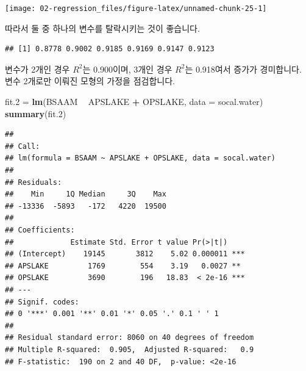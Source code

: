 \documentclass[12pt,]{book}
\newenvironment{Shaded}{\begin{snugshade}}{\end{snugshade}}
\newcommand{\DataTypeTok}[1]{\textcolor[rgb]{0.13,0.29,0.53}{#1}}
\newcommand{\FloatTok}[1]{\textcolor[rgb]{0.00,0.00,0.81}{#1}}
\newcommand{\KeywordTok}[1]{\textcolor[rgb]{0.13,0.29,0.53}{\textbf{#1}}}
\newcommand{\NormalTok}[1]{#1}
\newcommand{\OperatorTok}[1]{\textcolor[rgb]{0.81,0.36,0.00}{\textbf{#1}}}
\newcommand{\StringTok}[1]{\textcolor[rgb]{0.31,0.60,0.02}{#1}}
\begin{document}
\begin{Shaded}
\end{Shaded}

\begin{center}\texttt{[image: 02-regression\_files/figure-latex/unnamed-chunk-25-1]} \end{center}

따라서 둘 중 하나의 변수를 탈락시키는 것이 좋습니다.

\begin{Shaded}
\end{Shaded}

\begin{verbatim}
## [1] 0.8778 0.9002 0.9185 0.9169 0.9147 0.9123
\end{verbatim}

변수가 2개인 경우 \(R^2\)는 0.900이며, 3개인 경우 \(R^2\)는 0.918여서 증가가 경미합니다. 변수 2개로만 이뤄진 모형의 가정을 점검합니다.

\begin{Shaded}
\begin{Highlighting}[]
\NormalTok{fit}\FloatTok{.2}\NormalTok{ =}\StringTok{ }\KeywordTok{lm}\NormalTok{(BSAAM }\OperatorTok{~}\StringTok{ }\NormalTok{APSLAKE }\OperatorTok{+}\StringTok{ }\NormalTok{OPSLAKE, }\DataTypeTok{data =}\NormalTok{ socal.water)}
\KeywordTok{summary}\NormalTok{(fit}\FloatTok{.2}\NormalTok{)}
\end{Highlighting}
\end{Shaded}

\begin{verbatim}
## 
## Call:
## lm(formula = BSAAM ~ APSLAKE + OPSLAKE, data = socal.water)
## 
## Residuals:
##    Min     1Q Median     3Q    Max 
## -13336  -5893   -172   4220  19500 
## 
## Coefficients:
##             Estimate Std. Error t value Pr(>|t|)    
## (Intercept)    19145       3812    5.02 0.000011 ***
## APSLAKE         1769        554    3.19   0.0027 ** 
## OPSLAKE         3690        196   18.83  < 2e-16 ***
## ---
## Signif. codes:  
## 0 '***' 0.001 '**' 0.01 '*' 0.05 '.' 0.1 ' ' 1
## 
## Residual standard error: 8060 on 40 degrees of freedom
## Multiple R-squared:  0.905,  Adjusted R-squared:   0.9 
## F-statistic:  190 on 2 and 40 DF,  p-value: <2e-16
\end{verbatim}
\end{document}
